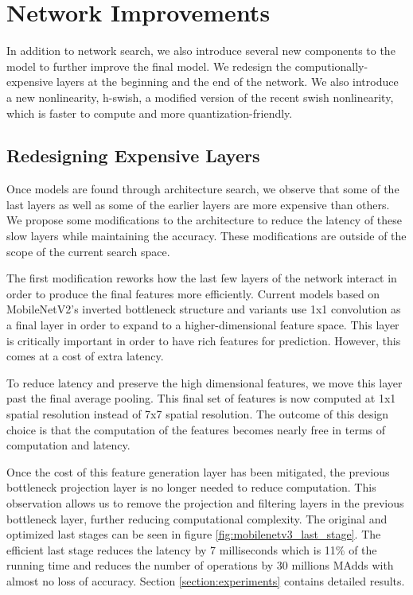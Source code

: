 \documentclass[10pt,twocolumn,letterpaper]{article}
\begin{document}
\section{Network Improvements}
\label{section:improvements}
%
In addition to network search, we also introduce several new components to the model to further improve the final model. We redesign the computionally-expensive layers at the beginning and the end of the network. We also introduce a new nonlinearity, h-swish, a modified version of the recent swish nonlinearity, which is faster to compute and more quantization-friendly.

\subsection{Redesigning Expensive Layers}

Once models are found through architecture search, we observe that some of the last layers as well as some of the earlier layers are more expensive than others. We propose some modifications to the architecture to reduce the latency of these slow layers while maintaining the accuracy. These modifications are outside of the scope of the current search space. 

The first modification reworks how the last few layers of the network interact in order to produce the final features more efficiently. Current models based on MobileNetV2's inverted bottleneck structure and variants use 1x1 convolution as a final layer in order to expand to a higher-dimensional feature space. This layer is critically important in order to have rich  features for prediction. However, this comes at a cost of extra latency. 

To reduce latency and preserve the high dimensional features, we move this layer past the final average pooling. This final set of features is now computed at 1x1 spatial resolution instead of 7x7 spatial resolution. The outcome of this design choice is that the computation of the features becomes nearly free in terms of computation and latency.

Once the cost of this feature generation layer has been mitigated, the previous bottleneck projection layer is no longer needed to reduce computation. This observation allows us to remove the projection and filtering layers in the previous bottleneck layer, further reducing computational complexity. The original and optimized last stages can be seen in figure \ref{fig:mobilenetv3_last_stage}. The efficient last stage reduces the latency by 7 milliseconds which is 11\% of the running time and reduces the number of operations by 30 millions MAdds with almost no loss of accuracy. Section \ref{section:experiments} contains detailed results. 
\end{document}
